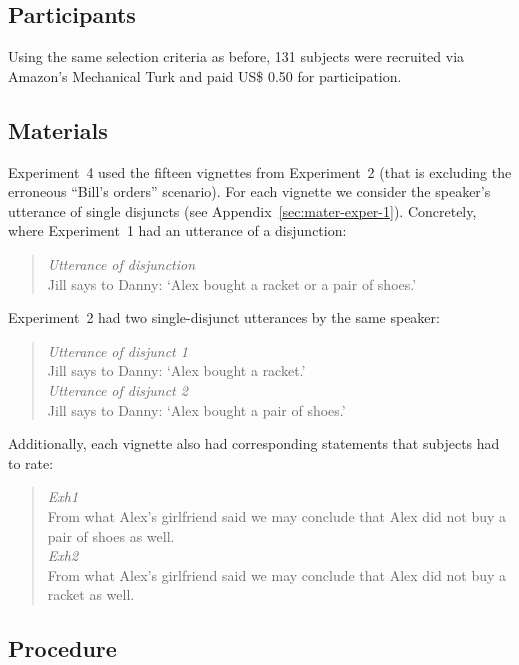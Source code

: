 \documentclass[12pt]{article}
\begin{document}
\subsection{Participants}

Using the same selection criteria as before, 131 subjects were recruited via Amazon's
Mechanical Turk and paid US\$ 0.50 for participation.

\subsection{Materials}

Experiment~4 used the fifteen vignettes from Experiment~2 (that is excluding the erroneous
``Bill's orders'' scenario). For each vignette we consider the speaker's utterance of single
disjuncts (see Appendix~\ref{sec:mater-exper-1}). Concretely, where Experiment~1 had an
utterance of a disjunction:

\begin{quote}
  \emph{Utterance of disjunction}\\
  Jill says to Danny: `Alex bought a racket or a pair of shoes.'
\end{quote}

\noindent Experiment~2 had two single-disjunct utterances by the same speaker:

\begin{quote}
  \emph{Utterance of disjunct 1}\\
  Jill says to Danny: `Alex bought a racket.' \\[.2cm]
  \emph{Utterance of disjunct 2}\\
  Jill says to Danny: `Alex bought a pair of shoes.'
\end{quote}

\noindent Additionally, each vignette also had corresponding statements that subjects had to
rate:

\begin{quote}
  \emph{Exh1}\\
  From what Alex's girlfriend said we may conclude that Alex did not buy a pair of shoes as well. \\[.2cm]
  \emph{Exh2}\\
  From what Alex's girlfriend said we may conclude that Alex did not buy a racket as well.
\end{quote}

\subsection{Procedure}
\end{document}
